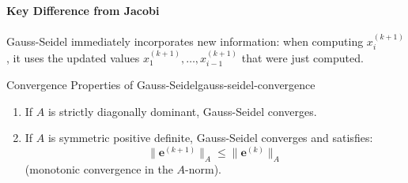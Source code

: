 \paragraph{Key Difference from Jacobi}
Gauss-Seidel immediately incorporates new information: when computing $x_i^{(k+1)}$, it uses the updated values $x_1^{(k+1)}, \ldots, x_{i-1}^{(k+1)}$ that were just computed.

\begin{theorem}{Convergence Properties of Gauss-Seidel}{gauss-seidel-convergence}
    \begin{enumerate}
        \item If $A$ is strictly diagonally dominant, Gauss-Seidel converges.
        \item If $A$ is symmetric positive definite, Gauss-Seidel converges and satisfies:
        \begin{equation}
            \|\mathbf{e}^{(k+1)}\|_A \leq \|\mathbf{e}^{(k)}\|_A
        \end{equation}
        (monotonic convergence in the $A$-norm).
    \end{enumerate}
\end{theorem}

